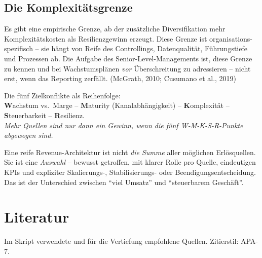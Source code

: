 \documentclass[11pt,a4paper,oneside]{article}
\newcommand{\caveatfontfallback}{\itshape}
\newcommand\caveatfont{\caveatfontfallback}%
\newcommand{\akzent}[1]{{\caveatfont\color{lpAmber}#1}}
\newcommand{\quelle}[1]{{\footnotesize\color{lpGray}(#1)}}
\begin{document}
\subsection{Die Komplexitätsgrenze}

Es gibt eine empirische Grenze, ab der zusätzliche Diversifikation mehr Komplexitätskosten als Resilienzgewinn erzeugt. Diese Grenze ist organisations-spezifisch -- sie hängt von Reife des Controllings, Datenqualität, Führungstiefe und Prozessen ab. Die Aufgabe des Senior-Level-Managements ist, diese Grenze zu kennen und bei Wachstumsplänen \emph{vor} Überschreitung zu adressieren -- nicht erst, wenn das Reporting zerfällt. \quelle{McGrath, 2010; Cusumano et al., 2019}

\begin{eselsbox}[Eselsbrücke: \akzent{W-M-K-S-R}]
Die fünf Zielkonflikte als Reihenfolge:\\[2pt]
\textbf{W}achstum vs.\ Marge -- \textbf{M}aturity (Kanalabhängigkeit) -- \textbf{K}omplexität -- \textbf{S}teuerbarkeit -- \textbf{R}esilienz.\\[2pt]
\emph{Mehr Quellen sind nur dann ein Gewinn, wenn die fünf W-M-K-S-R-Punkte abgewogen sind.}
\end{eselsbox}

\begin{merkbox}
Eine reife Revenue-Architektur ist nicht \emph{die Summe} aller möglichen Erlösquellen. Sie ist eine \emph{Auswahl} -- bewusst getroffen, mit klarer Rolle pro Quelle, eindeutigen KPIs und expliziter Skalierungs-, Stabilisierungs- oder Beendigungsentscheidung. Das ist der Unterschied zwischen ``viel Umsatz'' und ``steuerbarem Geschäft''.
\end{merkbox}

\clearpage
\section{Literatur}

Im Skript verwendete und für die Vertiefung empfohlene Quellen. Zitierstil: APA-7.
\end{document}
